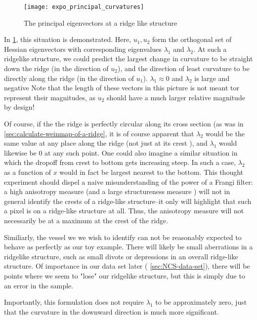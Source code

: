     \begin{figure} \centering
    		\texttt{[image: expo\_principal\_curvatures]}
    		\caption{The principal eigenvectors at a ridge like structure} 
    	 \label{fig:expo-principal-curvatures}
    \end{figure}
    
    In \cref{fig:expo-principal-curvatures}, this situation is demonstrated. Here, $u_1, u_2$ form the orthogonal set of Hessian eigenvectors with corresponding eigenvalues $\lambda_1$ and $\lambda_2$. At such a ridgelike structure, we could predict the largest change in curvature to be straight down the ridge (in the direction of $u_2$), and the direction of least curvature to be directly along the ridge (in the direction  of $u_1$). $\lambda_1 \approx 0$ and $\lambda_2$ is large and negative  Note that the length of these vectors in this picture is not meant tor represent their magnitudes, as $u_2$ should have a much larger relative magnitude by design!
    
    Of course, if the the ridge is perfectly circular along its cross section (as was in \cref{sec:calculate-weinmap-of-a-ridge}, it is of course apparent that $\lambda_2$ would be the same value at any place along the ridge (not just at its crest ), and $\lambda_1$ would likewise be 0 at any such point.  One could also imagine a similar situation in which the dropoff from crest to bottom gets increasing steep. In such a case, $\lambda_2$ as a function of $x$ would in fact be largest nearest to the bottom. This thought experiment should dispel a naive misunderstanding of the power of a Frangi filter: a high anisotropy measure (and a large structureness measure ) will not in general identify the crests of a ridge-like structure--it only will highlight that such a pixel is on a ridge-like structure at all. Thus, the anisotropy measure will not necessarily be at a maximum at the crest of the ridge.
    
    Similiarly, the vessel we we wish to identify can not be reasonably expected to behave as perfectly as our toy example. There will likely be small aberrations in a ridgelike structure, such as small divots or depressions in an overall ridge-like structure. Of importance in our data set later ( \cref{sec:NCS-data-set}), there will be points where we seem to "lose" our ridgelike structure,
    but this is simply due to an error in the sample.
    
	Importantly, this formulation does not require $\lambda_1$ to be approximately zero, just that the curvature in the downward direction is much more significant.
    

